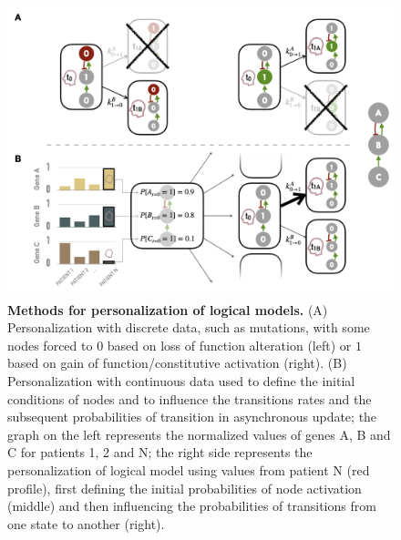 \documentclass[a4paper,12pt,twoside,onecolumn,openright,final,oldfontcommands]{memoir}
\begin{document}
\begin{figure}

{\centering \includegraphics[width=0.9\linewidth]{fig/logical-personalization} 

}

\caption[Methods for personalization of logical models]{\textbf{Methods for
personalization of logical models.} (A) Personalization with discrete
data, such as mutations, with some nodes forced to \(0\) based on loss
of function alteration (left) or \(1\) based on gain of
function/constitutive activation (right). (B) Personalization with
continuous data used to define the initial conditions of nodes and to
influence the transitions rates and the subsequent probabilities of
transition in asynchronous update; the graph on the left represents the
normalized values of genes A, B and C for patients 1, 2 and N; the right
side represents the personalization of logical model using values from
patient N (red profile), first defining the initial probabilities of
node activation (middle) and then influencing the probabilities of
transitions from one state to another (right).}\label{fig:logical-personalization}
\end{figure}
\end{document}
